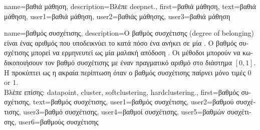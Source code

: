 {name={\foreignlanguage{greek}{βαθιά μάθηση}},
	description={\foreignlanguage{greek}{Βλέπε} \gls{deepnet}.},
	first={\foreignlanguage{greek}{βαθιά μάθηση}},
	text={\foreignlanguage{greek}{βαθιά μάθηση}},
	user1={\foreignlanguage{greek}{βαθιά μάθηση}}, %
    	user2={\foreignlanguage{greek}{βαθιάς μάθησης}}, %
	user3={\foreignlanguage{greek}{βαθιά μάθηση}} %
}

{name={\foreignlanguage{greek}{βαθμός συσχέτισης}},
	description={\foreignlanguage{greek}{Ο βαθμός συσχέτισης} (degree of belonging) 
		\foreignlanguage{greek}{είναι ένας αριθμός που υποδεικνύει το κατά πόσο ένα}  
		\foreignlanguage{greek}{ανήκει σε μία}  \cite[\foreignlanguage{greek}{Κεφ.} 8]{MLBasics}. \foreignlanguage{greek}{Ο 
		βαθμός συσχέτισης μπορεί να ερμηνευτεί ως μία μαλακή απόδοση} . \foreignlanguage{greek}{Οι μέθοδοι} 
		 \foreignlanguage{greek}{μπορούν να κωδικοποιήσουν τον βαθμό συσχέτισης με έναν πραγματικό  
		αριθμό στο διάστημα $[0,1]$. Η}  \foreignlanguage{greek}{προκύπτει ως η ακραία περίπτωση όταν ο βαθμός 
		συσχέτισης παίρνει μόνο τιμές} $0$ or $1$.
		\\
		\foreignlanguage{greek}{Βλέπε επίσης:} \gls{datapoint}, \gls{cluster}, \gls{softclustering}, \gls{hardclustering}.}, 
	first={\foreignlanguage{greek}{βαθμός συσχέτισης}},
	text={\foreignlanguage{greek}{βαθμός συσχέτισης}},
	user1={\foreignlanguage{greek}{βαθμός συσχέτισης}}, %
    	user2={\foreignlanguage{greek}{βαθμού συσχέτισης}}, %
	user3={\foreignlanguage{greek}{βαθμό συσχέτισης}}, %
    	user4={\foreignlanguage{greek}{βαθμοί συσχέτισης}}, %
	user5={\foreignlanguage{greek}{βαθμών συσχέτισης}}, %
    	user6={\foreignlanguage{greek}{βαθ\-μούς συσχέτισης}} %
}

